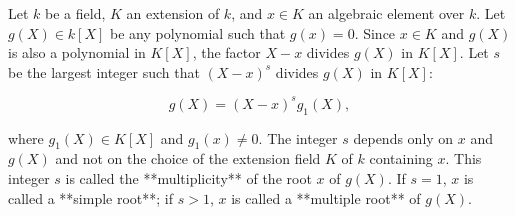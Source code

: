 Let $k$ be a field, $K$ an extension of $k$, and $x \in K$ an algebraic element over $k$. Let $g(X) \in k[X]$ be any polynomial such that $g(x) = 0$. Since $x \in K$ and $g(X)$ is also a polynomial in $K[X]$, the factor $X - x$ divides $g(X)$ in $K[X]$. Let $s$ be the largest integer such that $(X - x)^s$ divides $g(X)$ in $K[X]$:

$$g(X) = (X - x)^s g_1(X),$$

where $g_1(X) \in K[X]$ and $g_1(x) \neq 0$. The integer $s$ depends only on $x$ and $g(X)$ and not on the choice of the extension field $K$ of $k$ containing $x$. This integer $s$ is called the **multiplicity** of the root $x$ of $g(X)$. If $s = 1$, $x$ is called a **simple root**; if $s > 1$, $x$ is called a **multiple root** of $g(X)$.
